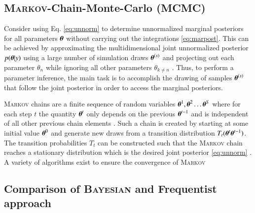 \subsection{\textsc{Markov}-Chain-Monte-Carlo (MCMC)}
Consider using Eq. \eqref{eq:unnorm} to determine unnormalized marginal posteriors for all parameters $\boldsymbol{\theta}$ without carrying out the integrations \eqref{eq:marpost}. This can be achieved by approximating the multidimensional joint unnormalized posterior $p(\boldsymbol{\theta}|y)$ using a large number of simulation draws $\boldsymbol{\theta}^{(s)}$ and projecting out each parameter $\theta_n$ while ignoring all other parameters $\theta_{k\neq n}$ \cite{Trotta_2008}. Thus, to perform a parameter inference, the main task is to accomplish the drawing of samples $\boldsymbol{\theta}^{(s)}$ that follow the joint posterior in order to access the marginal posteriors.

\textsc{Markov} chains are a finite sequence of  random variables $\boldsymbol{\theta}^{1},\boldsymbol{\theta}^{2}\dots\boldsymbol{\theta}^S$ where for each step $t$ the quantity $\boldsymbol{\theta}^t$ only depends on the previous $\boldsymbol{\theta}^{t-1}$ and is independent  of all other previous chain elements \cite{bayes}. Such a chain is created by starting at some initial value $\boldsymbol{\theta}^0$ and generate new draws from a transition distribution $T_t(\boldsymbol{\theta}^t\boldsymbol{\theta}^{t-1})$. The transition probabilities $T_t$ can be constructed such that the \textsc{Markov} chain reaches a stationary distribution which is the desired joint posterior \eqref{eq:unnorm} \cite{bayes,norris_1997}. A variety of algorithms exist to ensure the convergence of \textsc{Markov}
\subsection{Comparison of \textsc{Bayesian} and Frequentist approach}
